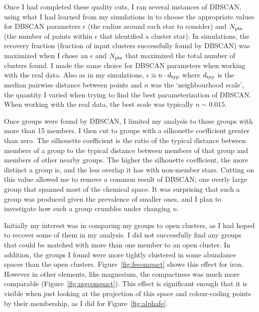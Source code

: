 \documentclass[11pt]{article}
\begin{document}
Once I had completed these quality cuts, I ran several instances of DBSCAN, using what I had learned from my simulations in \citep{Price-Jones2019} to choose the appropriate values for DBSCAN parameters $\epsilon$ (the radius around each star to consider) and $N_{\rm pts}$ (the number of points within $\epsilon$ that identified a cluster star). In simulations, the recovery fraction (fraction of input clusters successfully found by DBSCAN) was maximized when I chose an $\epsilon$ and $N_{\rm pts}$ that maximized the total number of clusters found. I made the same choice for DBSCAN parameters when working with the real data. Also as in my simulations, $\epsilon\equiv n\cdot d_{\rm typ}$ where $d_{\rm typ}$ is the median pairwise distance between points and $n$ was the `neighbourhood scale', the quantity I varied when trying to find the best parameterization of DBSCAN. When working with the real data, the best scale was typically $n\sim0.015$.

Once groups were found by DBSCAN, I limited my analysis to those groups with more than 15 members. I then cut to groups with a silhouette coefficient greater than zero. The silhouette coefficient is the ratio of the typical distance between members of a group to the typical distance between members of that group and members of other nearby groups. The higher the silhouette coefficient, the more distinct a group is, and the less overlap it has with non-member stars. Cutting on this value allowed me to remove a common result of DBSCAN; one overly large group that spanned most of the chemical space. It was surprising that such a group was produced given the prevalence of smaller ones, and I plan to investigate how such a group crumbles under changing $n$.

Initially my interest was in comparing my groups to open clusters, as I had hoped to recover some of them in my analysis. I did not successfully find any groups that could be matched with more than one member to an open cluster. In addition, the groups I found were more tightly clustered in some abundance spaces than the open clusters. Figure~\ref{fig:fecompact} shows this effect for iron. However in other elements, like magnesium, the compactness was much more comparable (Figure~\ref{fig:mgcompact}). This effect is significant enough that it is visible when just looking at the projection of this space and colour-coding points by their membership, as I did for Figure~\ref{fig:alphafe}.
\end{document}
